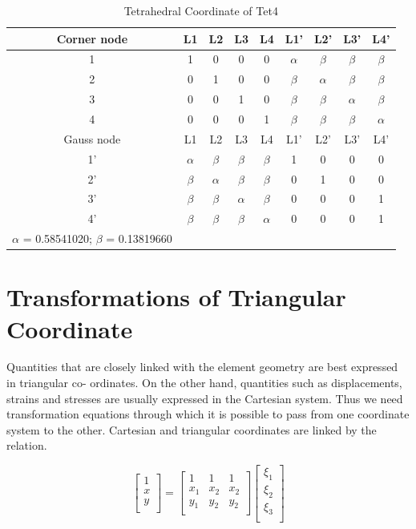 \begin{table}
	\centering
	\caption{Tetrahedral Coordinate of Tet4}
	\begin{tabular}{ccccccccc}			
		\hline
		Corner node\centering& L1& L2& L3& L4& L1'& L2'& L3'& L4'\\ \hline
		1\centering& 1& 0& 0& 0& $\alpha$& $\beta$& $\beta$& $\beta$\\
		2\centering& 0& 1& 0& 0& $\beta$& $\alpha$& $\beta$& $\beta$\\
		3\centering& 0& 0& 1& 0& $\beta$& $\beta$& $\alpha$& $\beta$\\
		4\centering& 0& 0& 0& 1& $\beta$& $\beta$& $\beta$& $\alpha$\\
		\hline
		Gauss node\centering& L1& L2& L3& L4& L1'& L2'& L3'& L4' \\ \hline
		1'\centering& $\alpha$& $\beta$& $\beta$& $\beta$& 1& 0& 0& 0  \\
		2'\centering&$\beta$ & $\alpha$& $\beta$& $\beta$& 0& 1& 0& 0 \\
		3'\centering& $\beta$& $\beta$& $\alpha$& $\beta$& 0& 0& 0& 1\\
		4'\centering& $\beta$& $\beta$& $\beta$& $\alpha$& 0& 0& 0& 1\\
		\hline
		$\alpha$ = 0.58541020; $\beta$ = 0.13819660&&&&&&&&\\
		\hline 		    
	\end{tabular}	
\end{table}		



\section{Transformations of Triangular Coordinate}
Quantities that are closely linked with the element geometry are best expressed in triangular co- ordinates. On the other hand, quantities such as displacements, strains and stresses are usually expressed in the Cartesian system. Thus we need transformation equations through which it is possible to pass from one coordinate system to the other.
Cartesian and triangular coordinates are linked by the relation.

\begin{equation}
\begin{bmatrix}
1 \\
x \\
y \\
\end{bmatrix}
= 
\begin{bmatrix}
1&1&1 \\
x_1&x_2&x_2 \\
y_1&y_2&y_2 \\
\end{bmatrix}
\begin{bmatrix}
\xi_1 \\
\xi_2 \\
\xi_3 \\
\end{bmatrix}
\end{equation}

